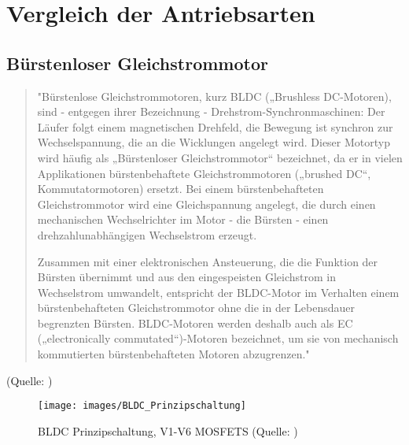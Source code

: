 \renewcommand{\autoren}{Severin Schendel	}
\newpage
\section{Vergleich der Antriebsarten}
\subsection{Bürstenloser Gleichstrommotor}
	
\begin{quote}
"Bürstenlose Gleichstrommotoren, kurz BLDC („Brushless DC-Motoren), sind -  entgegen ihrer Bezeichnung - Drehstrom-Synchronmaschinen: Der Läufer folgt einem magnetischen Drehfeld, die Bewegung ist synchron zur Wechselspannung, die an die Wicklungen angelegt wird. Dieser Motortyp wird häufig als „Bürstenloser Gleichstrommotor“ bezeichnet, da er in vielen Applikationen bürstenbehaftete Gleichstrommotoren („brushed DC“, Kommutatormotoren) ersetzt. Bei einem bürstenbehafteten Gleichstrommotor wird eine Gleichspannung angelegt, die durch einen mechanischen Wechselrichter im Motor - die Bürsten - einen drehzahlunabhängigen Wechselstrom erzeugt.

Zusammen mit einer elektronischen Ansteuerung, die die Funktion der Bürsten übernimmt und aus den eingespeisten Gleichstrom in Wechselstrom umwandelt, entspricht der BLDC-Motor im Verhalten einem bürstenbehafteten Gleichstrommotor ohne die in der Lebensdauer begrenzten Bürsten.  BLDC-Motoren werden deshalb auch als EC („electronically commutated“)-Motoren bezeichnet, um sie von mechanisch kommutierten bürstenbehafteten Motoren abzugrenzen."
\end{quote}
(Quelle: \cite{BLDCNanotec})
\begin{figure}[h]  %
\centering\texttt{[image: images/BLDC\_Prinzipschaltung]}
\caption{BLDC Prinzipschaltung, V1-V6 MOSFETS \newline (Quelle: \cite{PrinzipBLDC})}
\label{PrinzipBLDC}
\end{figure}

